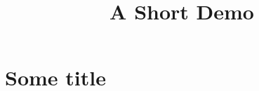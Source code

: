 \documentclass[article]{jss}
\title{A Short Demo}
\begin{document}
\section{Some  title}
\end{document}
